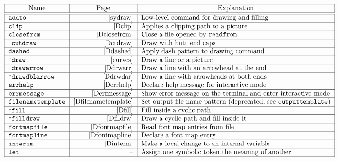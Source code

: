 \begin{table}[htp]
\caption{Commands}
$$\begin{tabular}{|l|r|l|}
\hline
\multicolumn1{|c}{Name}&  \multicolumn1{|c}{Page}&  \multicolumn1{|c|}{Explanation}\\
\hline
\hline
\tt \verb|addto|&       \pageref{sydraw}&
        Low-level command for drawing and filling\\\hline
\tt \verb|clip|&        \pageref{Dclip}&
        Applies a clipping path to a picture\\\hline
\tt \verb|closefrom|&  \pageref{Dclosefrom}&
        Close a file opened by {\tt readfrom}\\\hline
\pl\tt \verb|cutdraw|&  \pageref{Dctdraw}&
        Draw with butt end caps\\\hline
\tt \verb|dashed|&     \pageref{Ddashed}&
        Apply dash pattern to drawing command\\\hline
\pl\tt \verb|draw|&     \pageref{curves}&
        Draw a line or a picture\\\hline
\pl\tt \verb|drawarrow|&        \pageref{Ddrwarr}&
        Draw a line with an arrowhead at the end\\\hline
\pl\tt \verb|drawdblarrow|&     \pageref{Ddrwdar}&
        Draw a line with arrowheads at both ends\\\hline
\tt \verb|errhelp|& \pageref{Derrhelp}&
        Declare help message for interactive mode\\\hline
\tt \verb|errmessage|& \pageref{Derrmessage}&
        Show error message on the terminal and enter interactive
        mode\\\hline
\tt \verb|filenametemplate|& \pageref{Dfilenametemplate}&
        Set output file name pattern (deprecated, see
        \verb|outputtemplate|)\\\hline
\pl\tt \verb|fill|&     \pageref{Dfill}&
        Fill inside a cyclic path\\\hline
\pl\tt \verb|filldraw|& \pageref{Dfildrw}&
        Draw a cyclic path and fill inside it\\\hline
\tt \verb|fontmapfile|&     \pageref{Dfontmapfile}&
        Read font map entries from file\\\hline
\tt \verb|fontmapline|&     \pageref{Dfontmapline}&
        Declare a font map entry\\\hline
\tt \verb|interim|&     \pageref{Dinterm}&
        Make a local change to an internal variable\\\hline
\tt \verb|let|& --&
        Assign one symbolic token the meaning of another\\\hline

\end{tabular}$$
\end{table}
